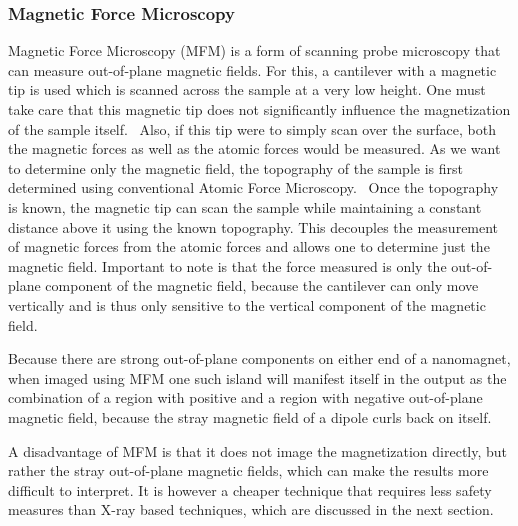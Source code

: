 \documentclass[10pt,a4paper]{article}
\begin{document}
\subsubsection{Magnetic Force Microscopy}
Magnetic Force Microscopy (MFM) is a form of scanning probe microscopy that can measure out-of-plane magnetic fields. For this, a cantilever with a magnetic tip is used which is scanned across the sample at a very low height. One must take care that this magnetic tip does not significantly influence the magnetization of the sample itself.~\cite{Probing_MagnetoOptics} Also, if this tip were to simply scan over the surface, both the magnetic forces as well as the atomic forces would be measured. As we want to determine only the magnetic field, the topography of the sample is first determined using conventional Atomic Force Microscopy.~\cite{PEEM, NML_Carlton} Once the topography is known, the magnetic tip can scan the sample while maintaining a constant distance above it using the known topography. This decouples the measurement of magnetic forces from the atomic forces and allows one to determine just the magnetic field. Important to note is that the force measured is only the out-of-plane component of the magnetic field, because the cantilever can only move vertically and is thus only sensitive to the vertical component of the magnetic field.~\cite{NML_Carlton} \par
Because there are strong out-of-plane components on either end of a nanomagnet, when imaged using MFM one such island will manifest itself in the output as the combination of a region with positive and a region with negative out-of-plane magnetic field, because the stray magnetic field of a dipole curls back on itself.~\cite{NML_Carlton} \par %
A disadvantage of MFM is that it does not image the magnetization directly, but rather the stray out-of-plane magnetic fields, which can make the results more difficult to interpret. It is however a cheaper technique that requires less safety measures than X-ray based techniques, which are discussed in the next section.
\end{document}
